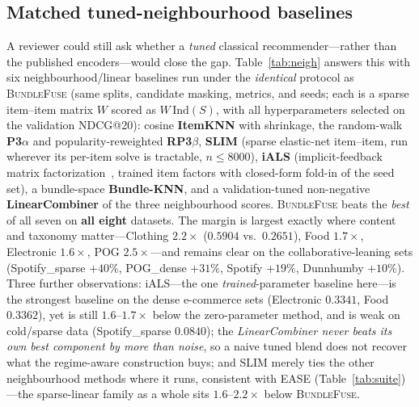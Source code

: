 \subsection{Matched tuned-neighbourhood baselines}
\label{sec:neigh}
A reviewer could still ask whether a \emph{tuned} classical recommender---rather than the published encoders---would
close the gap. Table~\ref{tab:neigh} answers this with six neighbourhood/linear baselines run under the
\emph{identical} protocol as \textsc{BundleFuse} (same splits, candidate masking, metrics, and seeds; each is a sparse
item--item matrix $W$ scored as $W\,\mathrm{Ind}(S)$, with all hyperparameters selected on the validation NDCG@20):
cosine \textbf{ItemKNN} with shrinkage, the random-walk \textbf{P3$\alpha$} and popularity-reweighted \textbf{RP3$\beta$},
\textbf{SLIM} (sparse elastic-net item--item, run wherever its per-item solve is tractable, $n\le 8000$),
\textbf{iALS} (implicit-feedback matrix factorization~\cite{hu2008}, trained item factors with closed-form fold-in of the
seed set), a bundle-space \textbf{Bundle-KNN}, and a validation-tuned non-negative \textbf{LinearCombiner} of the three
neighbourhood scores.
\textsc{BundleFuse} beats the \emph{best} of all seven on \textbf{all eight} datasets. The margin is largest exactly where
content and taxonomy matter---Clothing $2.2\times$ ($0.5904$ vs.\ $0.2651$), Food $1.7\times$, Electronic $1.6\times$, POG
$2.5\times$---and remains clear on the collaborative-leaning sets (Spotify\_sparse $+40\%$, POG\_dense $+31\%$, Spotify
$+19\%$, Dunnhumby $+10\%$). Three further observations: iALS---the one \emph{trained}-parameter baseline here---is the
strongest baseline on the dense e-commerce sets (Electronic $0.3341$, Food $0.3362$), yet is still $1.6$--$1.7\times$ below
the zero-parameter method, and is weak on cold/sparse data (Spotify\_sparse $0.0840$); the \emph{LinearCombiner never beats
its own best component by more than noise}, so a naive tuned blend does not recover what the regime-aware construction buys;
and SLIM merely ties the other neighbourhood methods where it runs, consistent with EASE (Table~\ref{tab:suite})---the
sparse-linear family as a whole sits $1.6$--$2.2\times$ below \textsc{BundleFuse}.

